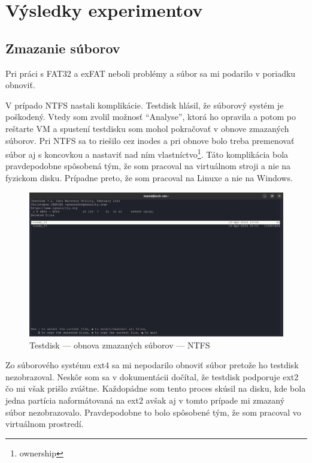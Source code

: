 \documentclass[12pt,oneside,slovak,a4paper]{article}
\begin{document}
\section{Výsledky experimentov}
\subsection{Zmazanie súborov}
Pri práci s FAT32 a exFAT neboli problémy a súbor sa mi podarilo v poriadku obnoviť.

V prípado NTFS nastali komplikácie. Testdisk hlásil, že súborový systém je poškodený. Vtedy som zvolil možnosť ``Analyse'', ktorá ho opravila a potom po reštarte VM a spustení testdisku som mohol pokračovať v obnove zmazaných súborov. Pri NTFS sa to riešilo cez inodes a pri obnove bolo treba premenovať súbor aj s koncovkou a nastaviť nad ním vlastníctvo\footnote{ownership}. Táto komplikácia bola pravdepodobne spôsobená tým, že som pracoval na virtuálnom stroji a nie na fyzickom disku. Prípadne preto, že som pracoval na Linuxe a nie na Windows.

\begin{figure}[H]
	\centering
	\includegraphics[scale=0.8]{./images/testdisk_testing/testdisk_deleted_file_recovery3.png}
	\centering
	\captionsetup{justification=centering,margin=2cm}
	\caption{Testdisk --- obnova zmazaných súborov --- NTFS}
\end{figure}

Zo súborového systému ext4 sa mi nepodarilo obnoviť súbor pretože ho testdisk nezobrazoval. Neskôr som sa v dokumentácii dočítal, že testdisk podporuje ext2 čo mi však prišlo zváštne. Každopádne som tento proces skúsil na disku, kde bola jedna partícia naformátovaná na ext2 avšak aj v tomto prípade mi zmazaný súbor nezobrazovalo. Pravdepodobne to bolo spôsobené tým, že som pracoval vo virtuálnom prostredí.
\end{document}
